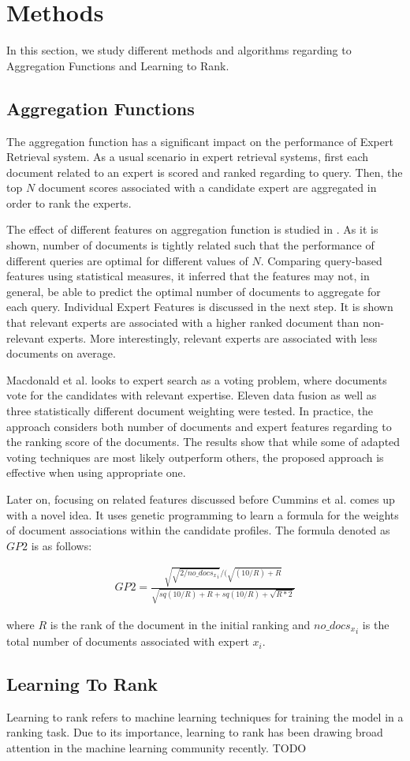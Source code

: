 \section{Methods}
\label{sec:methods}
In this section, we study different methods and algorithms regarding to Aggregation Functions and Learning to Rank.

\subsection{Aggregation Functions}
The aggregation function has a significant impact on the performance of Expert Retrieval system. As a usual scenario in expert retrieval systems, first each document related to an expert is scored and ranked regarding to query. Then, the top $N$ document scores associated with a candidate expert are aggregated in order to rank the experts. 

The effect of different features on aggregation function is studied in \cite{agg-gp2}. As it is shown, number of documents is tightly related such that the performance of different queries are optimal for different values of $N$. Comparing query-based features using statistical measures, it inferred that the features may not, in general, be able to predict the optimal number of documents to aggregate for each query. Individual Expert Features is discussed in the next step. It is shown that relevant experts are associated with a higher ranked document than non-relevant experts. More interestingly, relevant experts are associated with less documents on average.

Macdonald et al.\cite{agg-vote} looks to expert search as a voting problem, where documents vote for the candidates with relevant expertise. Eleven data fusion as well as three statistically different document weighting were tested. In practice, the approach considers both number of documents and expert features regarding to the ranking score of the documents. The results show that while some of adapted voting techniques are most likely outperform others, the proposed approach is effective when using appropriate one.

Later on, focusing on related features discussed before Cummins et al.\cite{agg-gp2} comes up with a novel idea. It uses genetic programming to learn a formula for the weights of document associations within the candidate profiles. The formula denoted as $GP2$ is as follows:

\begin{align*}
GP2 = \frac{\sqrt{\sqrt{2/{no\_docs_x}_i}}/(\sqrt{(10/R)+R}}{\sqrt{sq(10/R)+R+sq(10/R)+\sqrt{R*2}}}
\end{align*}

\noindent 
where $R$ is the rank of the document in the initial ranking and ${no\_docs_x}_i$ is the total number of documents associated with expert $x_i$.

\subsection{Learning To Rank}
Learning to rank refers to machine learning techniques for training the model in a ranking task. Due to its importance, learning to rank has been drawing broad attention in the machine learning community recently. 
TODO
